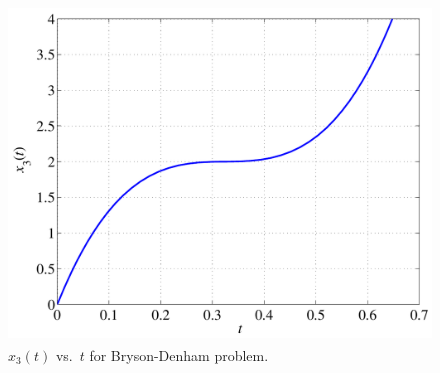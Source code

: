 \documentclass[10pt,final]{report}
\begin{document}
\begin{figure}[H]
  \centering
  \includegraphics[height=3.5in]{x3vstBrysonDenham.pdf}
  \caption{$x_3(t)$ vs.~$t$ for Bryson-Denham problem.}
\end{figure}
\end{document}
